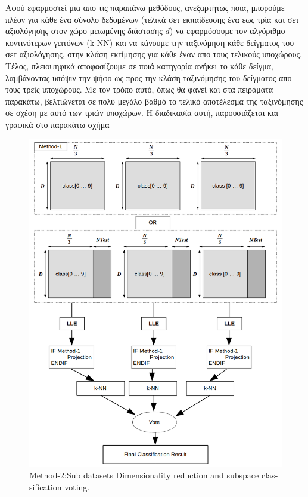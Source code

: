 \par
Αφού εφαρμοστεί μια απο τις παραπάνω μεθόδους, ανεξαρτήτως ποια, μπορούμε πλέον για κάθε ένα σύνολο δεδομένων (τελικά σετ εκπαίδευσης ένα εως τρία και σετ αξιολόγησης στον χώρο μειωμένης διάστασης $d$) να εφαρμόσουμε τον αλγόριθμο κοντινότερων γειτόνων \textlatin{(k-NN)} και να κάνουμε την ταξινόμηση κάθε δείγματος του σετ αξιολόγησης, στην κλάση εκτίμησης για κάθε έναν απο τους τελικούς υποχώρους. Τέλος, πλειοψηφικά αποφασίζουμε σε ποιά κατηγορία ανήκει το κάθε δείγμα, λαμβάνοντας υπόψιν την ψήφο ως προς την κλάση ταξινόμησης του δείγματος απο τους τρείς υποχώρους. Με τον τρόπο αυτό, όπως θα φανεί και στα πειράματα παρακάτω, βελτιώνεται σε πολύ μεγάλο βαθμό το τελικό αποτέλεσμα της ταξινόμησης σε σχέση με αυτό των τριών υποχώρων. Η διαδικασία αυτή, παρουσιάζεται και γραφικά στο παρακάτω σχήμα
\newpage
\begin{figure}[H]
\centering
\includegraphics[scale=0.8]{figs/7.png}
\newline
\caption{ \textlatin{Method-2:Sub datasets Dimensionality reduction and subspace classification voting}.} 
\end{figure}
\newpage

